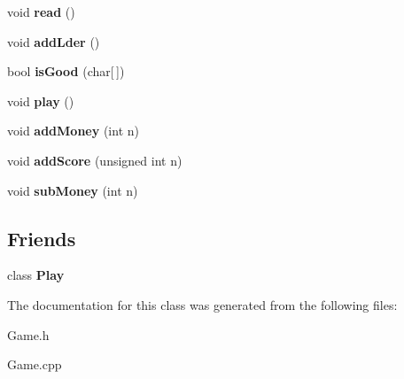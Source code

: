 \begin{DoxyCompactItemize}
void {\bfseries read} ()
\item 
\hypertarget{class_game_abe4a583fc8cbb16b634735a59a654e73}{}\label{class_game_abe4a583fc8cbb16b634735a59a654e73} 
void {\bfseries add\+Lder} ()
\item 
\hypertarget{class_game_a08052a1f1c2a02a44f3de00a334aff28}{}\label{class_game_a08052a1f1c2a02a44f3de00a334aff28} 
bool {\bfseries is\+Good} (char\mbox{[}$\,$\mbox{]})
\item 
\hypertarget{class_game_aa333825d0bca80e91e53c7e23f053405}{}\label{class_game_aa333825d0bca80e91e53c7e23f053405} 
void {\bfseries play} ()
\item 
\hypertarget{class_game_a89b055e7b416437f168a24dcf5e15127}{}\label{class_game_a89b055e7b416437f168a24dcf5e15127} 
void {\bfseries add\+Money} (int n)
\item 
\hypertarget{class_game_ae3e03b72d7dff709b9b25ced1fe3b832}{}\label{class_game_ae3e03b72d7dff709b9b25ced1fe3b832} 
void {\bfseries add\+Score} (unsigned int n)
\item 
\hypertarget{class_game_aeb868c2a3628452c813cfd0ed3be76d5}{}\label{class_game_aeb868c2a3628452c813cfd0ed3be76d5} 
void {\bfseries sub\+Money} (int n)
\end{DoxyCompactItemize}
\subsection*{Friends}
\begin{DoxyCompactItemize}
\item 
\hypertarget{class_game_a7c2f46121e704a36ac14bdfdaced4e04}{}\label{class_game_a7c2f46121e704a36ac14bdfdaced4e04} 
class {\bfseries Play}
\end{DoxyCompactItemize}


The documentation for this class was generated from the following files\+:\begin{DoxyCompactItemize}
\item 
Game.\+h\item 
Game.\+cpp\end{DoxyCompactItemize}
